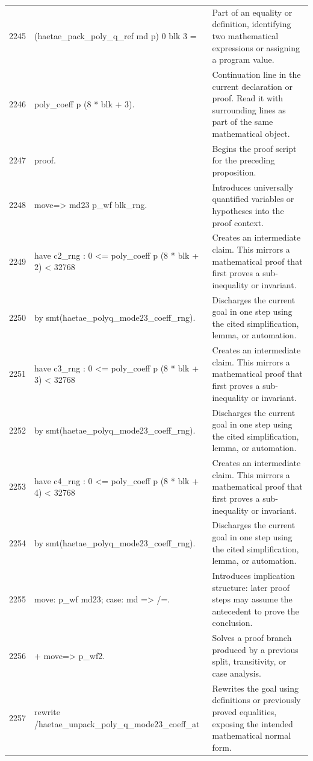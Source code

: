\documentclass[10pt]{article}
\begin{document}
\begin{longtable}{r L{0.53\textwidth} L{0.37\textwidth}}
2245 & {\ttfamily\scriptsize     (haetae\_pack\_poly\_q\_ref md p) 0 blk 3 =} & Part of an equality or definition, identifying two mathematical expressions or assigning a program value. \\
2246 & {\ttfamily\scriptsize   poly\_coeff p (8 * blk + 3).} & Continuation line in the current declaration or proof.  Read it with surrounding lines as part of the same mathematical object. \\
2247 & {\ttfamily\scriptsize proof.} & Begins the proof script for the preceding proposition. \\
2248 & {\ttfamily\scriptsize move=> md23 p\_wf blk\_rng.} & Introduces universally quantified variables or hypotheses into the proof context. \\
2249 & {\ttfamily\scriptsize have c2\_rng : 0 <= poly\_coeff p (8 * blk + 2) < 32768} & Creates an intermediate claim.  This mirrors a mathematical proof that first proves a sub-inequality or invariant. \\
2250 & {\ttfamily\scriptsize   by smt(haetae\_polyq\_mode23\_coeff\_rng).} & Discharges the current goal in one step using the cited simplification, lemma, or automation. \\
2251 & {\ttfamily\scriptsize have c3\_rng : 0 <= poly\_coeff p (8 * blk + 3) < 32768} & Creates an intermediate claim.  This mirrors a mathematical proof that first proves a sub-inequality or invariant. \\
2252 & {\ttfamily\scriptsize   by smt(haetae\_polyq\_mode23\_coeff\_rng).} & Discharges the current goal in one step using the cited simplification, lemma, or automation. \\
2253 & {\ttfamily\scriptsize have c4\_rng : 0 <= poly\_coeff p (8 * blk + 4) < 32768} & Creates an intermediate claim.  This mirrors a mathematical proof that first proves a sub-inequality or invariant. \\
2254 & {\ttfamily\scriptsize   by smt(haetae\_polyq\_mode23\_coeff\_rng).} & Discharges the current goal in one step using the cited simplification, lemma, or automation. \\
2255 & {\ttfamily\scriptsize move: p\_wf md23; case: md => /=.} & Introduces implication structure: later proof steps may assume the antecedent to prove the conclusion. \\
2256 & {\ttfamily\scriptsize + move=> p\_wf2.} & Solves a proof branch produced by a previous split, transitivity, or case analysis. \\
2257 & {\ttfamily\scriptsize   rewrite /haetae\_unpack\_poly\_q\_mode23\_coeff\_at} & Rewrites the goal using definitions or previously proved equalities, exposing the intended mathematical normal form. \\

\end{longtable}
\end{document}
